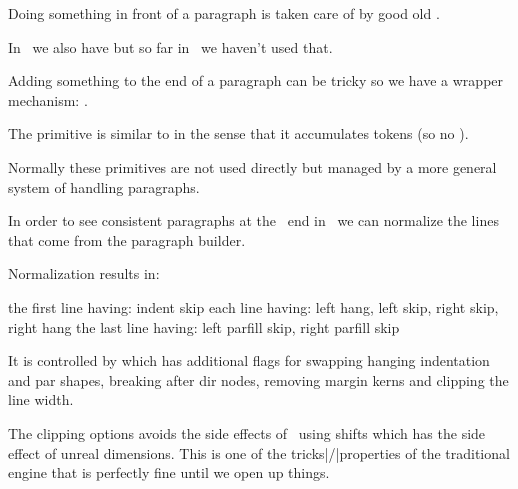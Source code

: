 
\stopitemize

\stoptitle

\starttitle[title=Wrapping]

\startitemize

\startitem
    Doing something in front of a paragraph is taken care of by good old
    \type {\everypar}.
\stopitem

\startitem
    In \LUAMETATEX\ we also have \type {\everybeforepar} but so far in \CONTEXT\
    we haven't used that.
\stopitem

\startitem
    Adding something to the end of a paragraph can be tricky so we have
    a wrapper mechanism: \type {\wrapuppar}.
\stopitem

\startitem
    The \type {\wrapuppar} primitive is similar to \type {\atendofgroup} in the
    sense that it accumulates tokens (so no \type {\endofpar}).
\stopitem

\startitem
    Normally these primitives are not used directly but managed by a more general
    system of handling paragraphs.
\stopitem

\stopitemize


\stoptitle

\starttitle[title=Normalizing]

\startitemize

\startitem
    In order to see consistent paragraphs at the \LUA\ end in \LUAMETATEX\
    we can normalize the lines that come from the paragraph builder.
\stopitem

\startitem
    Normalization results in:

    \startitemize
        \startitem
            the first line having: indent skip
        \stopitem
        \startitem
            each line having: left hang, left skip, right skip, right hang
        \stopitem
        \startitem
            the last line having: left parfill skip, right parfill skip
        \stopitem
    \stopitemize
\stopitem

\startitem
    It is controlled by \type {\normalizelinemode} which has additional flags for
    swapping hanging indentation and par shapes, breaking after dir nodes,
    removing margin kerns and clipping the line width.
\stopitem

\startitem
    The clipping options avoids the side effects of \TEX\ using shifts which has
    the side effect of unreal dimensions. This is one of the tricks|/|properties
    of the traditional engine that is perfectly fine until we open up things.
\stopitem

\stopitemize


\stoptitle

\stopdocument
